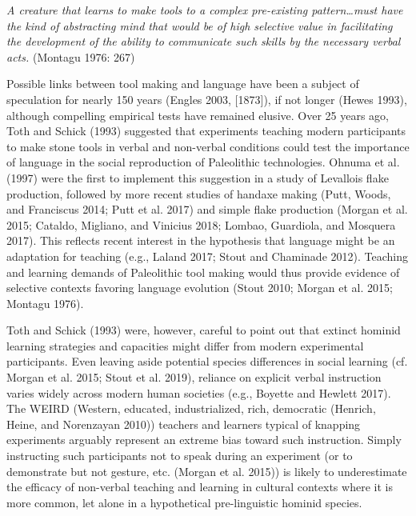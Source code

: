 \documentclass[smallextended]{svjour3}       %
\begin{document}
\emph{A creature that learns to make tools to a complex pre-existing
pattern\ldots must have the kind of abstracting mind that would be of
high selective value in facilitating the development of the ability to
communicate such skills by the necessary verbal acts.} (Montagu 1976:
267)

Possible links between tool making and language have been a subject of
speculation for nearly 150 years (Engles 2003, {[}1873{]}), if not
longer (Hewes 1993), although compelling empirical tests have remained
elusive. Over 25 years ago, Toth and Schick (1993) suggested that
experiments teaching modern participants to make stone tools in verbal
and non-verbal conditions could test the importance of language in the
social reproduction of Paleolithic technologies. Ohnuma et al. (1997)
were the first to implement this suggestion in a study of Levallois
flake production, followed by more recent studies of handaxe making
(Putt, Woods, and Franciscus 2014; Putt et al. 2017) and simple flake
production (Morgan et al. 2015; Cataldo, Migliano, and Vinicius 2018;
Lombao, Guardiola, and Mosquera 2017). This reflects recent interest in
the hypothesis that language might be an adaptation for teaching (e.g.,
Laland 2017; Stout and Chaminade 2012). Teaching and learning demands of
Paleolithic tool making would thus provide evidence of selective
contexts favoring language evolution (Stout 2010; Morgan et al. 2015;
Montagu 1976).

Toth and Schick (1993) were, however, careful to point out that extinct
hominid learning strategies and capacities might differ from modern
experimental participants. Even leaving aside potential species
differences in social learning (cf. Morgan et al. 2015; Stout et al.
2019), reliance on explicit verbal instruction varies widely across
modern human societies (e.g., Boyette and Hewlett 2017). The WEIRD
(Western, educated, industrialized, rich, democratic (Henrich, Heine,
and Norenzayan 2010)) teachers and learners typical of knapping
experiments arguably represent an extreme bias toward such instruction.
Simply instructing such participants not to speak during an experiment
(or to demonstrate but not gesture, etc. (Morgan et al. 2015)) is likely
to underestimate the efficacy of non-verbal teaching and learning in
cultural contexts where it is more common, let alone in a hypothetical
pre-linguistic hominid species.
\end{document}
